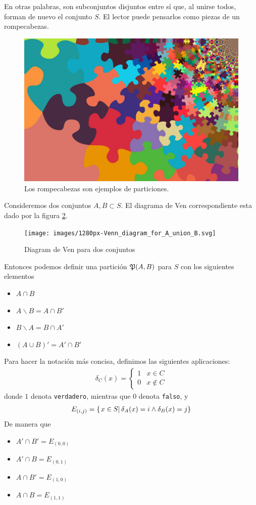 En otras palabras, son subconjuntos disjuntos entre sí que, al unirse todos, forman de nuevo el conjunto $ S $. El lector puede pensarlos como piezas de un rompecabezas.

\begin{figure}
	\centering
	\includegraphics[width=0.7\linewidth]{images/puzzle-5294291_1280}
	\caption[Rompecabezas]{Los rompecabezas son ejemplos de particiones.}
	\label{fig:puzzle-52942911280}
\end{figure}

Consideremos dos conjuntos $ A,B \subset S$. El diagrama de Ven correspondiente esta dado por la figura \ref{fig:1280px-venndiagramforaunionb}. 

\begin{figure}
	\centering
	\texttt{[image: images/1280px-Venn\_diagram\_for\_A\_union\_B.svg]}
	\caption{Diagram de Ven para dos conjuntos}
	\label{fig:1280px-venndiagramforaunionb}
\end{figure}

Entonces podemos definir una partición $ \mathfrak{P}(A,B) $ para $ S $ con los siguientes elementos
\begin{itemize}
	\item $ A\cap B $
	\item $ A\backslash B = A \cap B'$
	\item $ B\backslash A = B \cap A'$
	\item $ \left(A\cup B\right)' = A'\cap B' $
\end{itemize}

Para hacer la notación más concisa, definimos las siguientes aplicaciones:
\begin{align}
	\delta_C(x) = \begin{cases}
		1 & x \in C \\
		0 & x \not \in C
	\end{cases}
\end{align}
donde $ 1 $ denota \texttt{verdadero}, mientras que $ 0 $ denota \texttt{falso}, y
\begin{align}
	E_{(i,j)}=\left\{ \left.x\in S \right| \delta_{A}(x)=i\wedge\delta_{B}(x)=j \right\}
\end{align}
De manera que 
\begin{itemize}
	\item $ A' \cap B' = E_{(0,0)}$
	\item $ A'  \cap B = E_{(0,1)}$
	\item $ A \cap B'  = E_{(1,0)}$
	\item $ A  \cap B  = E_{(1,1)}$
\end{itemize}

